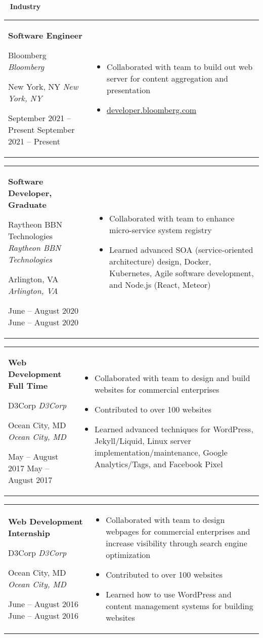 \documentclass[11pt,letterpaper]{article}
\newcommand{\sect}[1]{
\begin{center}
	\noindent\xrfill[0.7ex]{0.5pt} \mbox{ } {\Large \bf #1} \mbox{ } \xrfill[0.7ex]{0.5pt}
\end{center}
}
\newcommand{\entry}[5]{
	\noindent
	\begin{tabular}{p{2in} p{\dimexpr \linewidth-2\tabcolsep-2.25in}} %
		\noindent \textbf{#1}
		
		\ifx #2  \else \noindent \textit{#2} \fi
		
		\ifx #3  \else \noindent \textit{#3} \fi
		
		\ifx #4  \else \noindent #4 \fi
		&
		#5
	\end{tabular}
	\vspace{0.5cm}
}
\begin{document}
	\pagebreak
	\sect{Industry}
	
	\entry{Software Engineer}{Bloomberg}{New York, NY}{September 2021 -- Present}{
		\vspace{-5mm}
		\begin{itemize}[itemsep=0pt, wide]
			\item Collaborated with team to build out web server for content aggregation and presentation
			\item \url{developer.bloomberg.com}
		\end{itemize}
	}
	
	\entry{Software Developer, Graduate}{Raytheon BBN Technologies}{Arlington, VA}{June -- August 2020}{
		\vspace{-5mm}
		\begin{itemize}[itemsep=0pt, wide]
			\item Collaborated with team to enhance micro-service system registry
			\item Learned advanced SOA (service-oriented architecture) design, Docker, Kubernetes, Agile software development, and Node.js (React, Meteor)
		\end{itemize}
	}
	
	\entry{Web Development Full Time}{D3Corp}{Ocean City, MD}{May -- August 2017}{
		\vspace{-5mm}
		\begin{itemize}[itemsep=0pt, wide]
			\item Collaborated with team to design and build websites for commercial enterprises
			\item Contributed to over 100 websites
			\item Learned advanced techniques for WordPress, Jekyll/Liquid, Linux server implementation/maintenance, Google Analytics/Tags, and Facebook Pixel
		\end{itemize}
	}
	
	\entry{Web Development Internship}{D3Corp}{Ocean City, MD}{June -- August 2016}{
		\vspace{-5mm}
		\begin{itemize}[itemsep=0pt, wide]
			\item Collaborated with team to design webpages for commercial enterprises and increase visibility through search engine optimization
			\item Contributed to over 100 websites
			\item Learned how to use WordPress and content management systems for building websites
		\end{itemize}
	}
	
\end{document}
